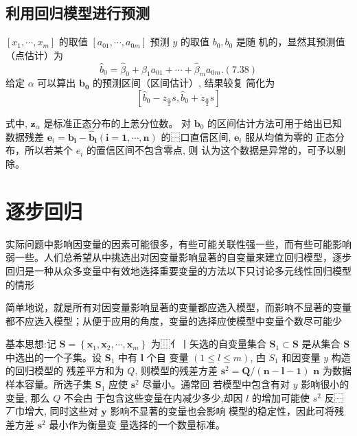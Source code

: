 \subsection{利用回归模型进行预测}

\( \left[x_{1}, \cdots, x_{m}\right] \) 的取值 \( \left[a_{01}, \cdots, a_{0 m}\right] \) 预测 \( y \) 的取值 \( b_{0}, b_{0} \) 是随 机的，显然其预测值（点估计）为
$$
\hat{b}_{0}=\hat{\beta}_{0}+\hat{\beta}_{1} a_{01}+\cdots+\hat{\beta}_{m} a_{0 m} .(7.38)
$$
给定 \( \alpha \) 可以算出 \( \boldsymbol{b}_{\mathbf{0}} \) 的预测区间（区间估计）, 结果较复
简化为
$$
\left[\hat{b}_{0}-z_{\frac{\alpha}{2}} s, \hat{b}_{0}+z_{\frac{\alpha}{2}} s\right]
$$

式中, \( \boldsymbol{z}_{\alpha} \) 是标准正态分布的上恙分位数。
对 \( \boldsymbol{b}_{0} \) 的区间估计方法可用于给出已知数据残差 \( \boldsymbol{e}_{i}=\boldsymbol{b}_{\boldsymbol{i}}-\hat{\boldsymbol{b}}_{\boldsymbol{i}}(\boldsymbol{i}=\mathbf{1}, \cdots, \boldsymbol{n}) \) 的⿱口直信区间, \( \boldsymbol{e}_{i} \) 服从均值为零的
正态分布，所以若某个 \( e_{i} \) 的置信区间不包含零点, 则 认为这个数据是异常的，可予以剔除。

\section{逐步回归}

实际问题中影响因变量的因素可能很多，有些可能关联性强一些，而有些可能影响弱一些。人们总希望从中挑选出对因变量影响显著的自变量来建立回归模型，逐步回归是一种从众多变量中有效地选择重要变量的方法以下只讨论多元线性回归模型的情形

简单地说，就是所有对因变量影响显著的变量都应选入模型，而影响不显著的变量都不应选入模型；从便于应用的角度，变量的选择应使模型中变量个数尽可能少

基本思想:记 \( \boldsymbol{S}=\left\{\boldsymbol{x}_{1}, \boldsymbol{x}_{2}, \cdots, \boldsymbol{x}_{m}\right\} \) 为⿲亻丨矢选的自变量集合
\( \boldsymbol{S}_{1} \subset \boldsymbol{S} \) 是从集合 \( \boldsymbol{S} \) 中选出的一个子集。设 \( \boldsymbol{S}_{1} \) 中有 \( \boldsymbol{l} \) 个自
变量 \( (1 \leq l \leq m) \), 甴 \( S_{1} \) 和因变量 \( y \) 构造的回归模型的 残差平方和为 \( Q \), 则模型的残差方差 \( \boldsymbol{s}^{2}=\boldsymbol{Q} /(\boldsymbol{n}-\boldsymbol{l}-\mathbf{1}) \)
\( \boldsymbol{n} \) 为数据样本容量。所选子集 \( \boldsymbol{S}_{1} \) 应使 \( \boldsymbol{s}^{2} \) 尽量小。通常回
若模型中包含有对 \( y \) 影响很小的变量, 那么 \( Q \) 不会甴 于包含这些变量在内减少多少,却因 \( l \) 的增加可能使 \( s^{2} \) 反⿱丆巾增大, 同时这些对 \( \boldsymbol{y} \) 影响不显著的变量也会影响 模型的稳定性，因此可将残差方差 \( \boldsymbol{s}^{2} \) 最小作为衡量变
量选择的一个数量标准。

